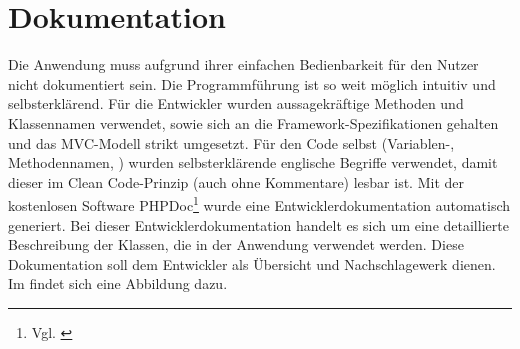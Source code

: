 \section{Dokumentation}
\label{sec:Dokumentation}
Die Anwendung muss aufgrund ihrer einfachen Bedienbarkeit für den Nutzer nicht dokumentiert
sein. Die Programmführung ist so weit möglich intuitiv und selbsterklärend.
Für die Entwickler wurden aussagekräftige Methoden und Klassennamen verwendet, sowie
sich an die Framework-Spezifikationen gehalten und das MVC-Modell strikt umgesetzt.
Für den Code selbst (Variablen-, Methodennamen, \etc) wurden selbsterklärende
englische Begriffe verwendet, damit dieser im Clean Code-Prinzip (auch ohne
Kommentare) lesbar ist.
Mit der kostenlosen Software PHPDoc\footnote{Vgl. \cite{phpdoc}}  wurde eine Entwicklerdokumentation automatisch generiert. Bei dieser Entwicklerdokumentation handelt es sich um eine detaillierte Beschreibung der Klassen, die in der Anwendung verwendet werden. Diese Dokumentation soll dem Entwickler als Übersicht und Nachschlagewerk dienen. Im  findet sich eine Abbildung dazu.
